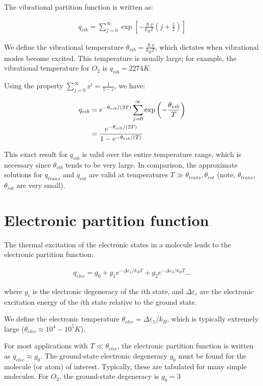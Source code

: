 \documentclass[book.tex]{subfiles}
\begin{document}
The vibrational partition function is written as:

\begin{align}\label{part_vib}
q_{vib}= \sum_{j=0}^\infty \exp \left[ - \frac{\hslash \nu}{k_BT}\left(j+\frac{1}{2}\right)\right]
\end{align}

We define the vibrational temperature $\theta_{vib}=\frac{\hslash \nu}{k_BT}$, which dictates when vibrational modes become excited. This temperature is usually large; for example, the vibrational temperature for $O_2$ is $q_{vib} = 2274K$.

Using the property $\sum_{j=0}^\infty z^j = \frac{1}{1-z}$, we have:

\begin{align}\label{part_vib_simple}
q_{vib} &= e^{-\theta_{vib}/(2T)}\sum_{j=0}^\infty \exp \left(-\frac{\theta_{vib}}{T}\right) \notag\\
&= \frac{ e^{-\theta_{vib}/(2T)}}{1- e^{-\theta_{vib}/(T)}}
\end{align}

This exact result for $q_{vib}$ is valid over the entire temperature range, which is necessary since $\theta_{vib}$ tends to be very large. In comparison, the approximate solutions for $q_{trans}$ and $q_{rot}$ are valid at temperatures $T\gg \theta_{trans},\theta_{rot}$ (note, $\theta_{trans}$, $\theta_{rot}$ are very small).

\section{Electronic partition function}
The thermal excitation of the electronic states in a molecule leads to the electronic partition function:

\begin{align}\label{part_elec}
q_{elec} = g_0 + g_1e^{-\Delta\varepsilon_1/k_BT}+g_2e^{-\Delta\varepsilon_2/k_BT}...
\end{align}

\noindent where $g_i$ is the electronic degeneracy of the $i$th state, and $\Delta\varepsilon_i$ are the electronic excitation energy of the $i$th state relative to the ground state.

We define the electronic temperature $\theta_{elec}=\Delta\varepsilon_1/k_B$, which is typically extremely large ($\theta_{elec} \approx 10^4 - 10^5 K$).

For most applications with $T\ll\theta_{elec}$, the electronic partition function is written as $q_{elec} \approx g_0$. The ground-state electronic degeneracy $g_0$ must be found for the molecule (or atom) of interest. Typically, these are tabulated for many simple molecules. For $O_2$, the ground-state degeneracy is $g_0 = 3$ 
\end{document}

